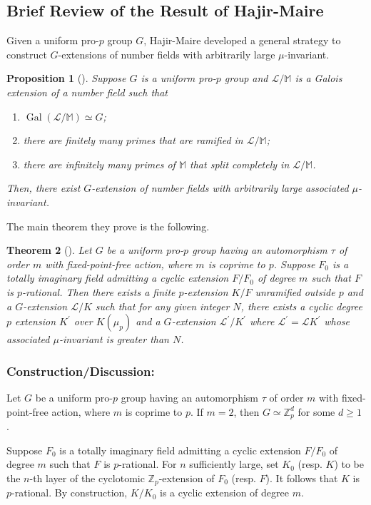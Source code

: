 \documentclass{amsart}
\DeclareMathOperator{\Gal}{Gal}
\newcommand{\FF}{\mathbb M}
\newcommand{\ZZ}{\mathbb Z}
\newcommand{\Linf}{\mathcal{L}}
\newtheorem{Th}{Theorem}[section]
\newtheorem{Prop}[Th]{Proposition}
\theoremstyle{definition}
\theoremstyle{remark}
\begin{document}
\subsection{Brief Review of the Result of Hajir-Maire \cite[Section 4]{HM19}}
\label{HM brief review}
Given a uniform pro-$p$ group $G$, Hajir-Maire developed a general strategy to construct $G$-extensions of number fields with arbitrarily large $\mu$-invariant.
\begin{Prop}[{\cite[Proposition 4.1]{HM19}}]
\label{prop: HM principle}
Suppose $G$ is a uniform pro-$p$ group and $\Linf/\FF$ is a Galois extension of a number field such that
\begin{enumerate}
\item $\Gal(\Linf/\FF) \simeq G$;
\item there are finitely many primes that are ramified in $\Linf/\FF$;
\item there are infinitely many primes of $\FF$ that split completely in $\Linf/\FF$.
\end{enumerate}
Then, there exist $G$-extension of number fields with arbitrarily large associated $\mu$-invariant.
\end{Prop}

The main theorem they prove is the following.
\begin{Th}[{\cite[Theorem 4.8]{HM19}}]
\label{thm of HM}
Let $G$ be a uniform pro-$p$ group having an automorphism $\tau$ of order $m$ with fixed-point-free action, where $m$ is coprime to $p$.
Suppose $F_0$ is a totally imaginary field admitting a cyclic extension $F/F_0$ of degree $m$ such that $F$ is $p$-rational.
Then there exists a finite $p$-extension $K/F$ unramified outside $p$ and a $G$-extension $\Linf/K$ such that for any given integer $N$, there exists a cyclic degree $p$ extension $K^\prime$ over $K(\mu_p)$ and a $G$-extension $\Linf^\prime/K^\prime$ where $\Linf^\prime = \Linf K^\prime$ whose associated $\mu$-invariant is greater than $N$. 
\end{Th}

\subsubsection{Construction/Discussion:}
\label{Discussion}
Let $G$ be a uniform pro-$p$ group having an automorphism $\tau$ of order $m$ with fixed-point-free action, where $m$ is coprime to $p$.
If $m=2$, then $G\simeq \ZZ_p^d$ for some $d\geq 1$ \cite[Corollary 4.6.10]{RZ00}.

Suppose $F_0$ is a totally imaginary field admitting a cyclic extension $F/F_0$ of degree $m$ such that $F$ is $p$-rational.
For $n$ sufficiently large, set $K_0$ (resp. $K$) to be the $n$-th layer of the cyclotomic $\ZZ_p$-extension of $F_0$ (resp. $F$).
It follows that $K$ is $p$-rational.
By construction, $K/K_0$ is a cyclic extension of degree $m$.
\end{document}
